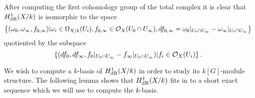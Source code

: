 After computing the first cohomology group of the total complex it is clear that $H_{\text {dR}}^1(X/k)$ is isomorphic to the space
    \begin{equation}\label{derhamconditions}
    \left\{(\omega_0, \omega_\infty, f_{0,\infty}) | \omega_i\in \Omega_{X/k}(U_i), f_{0,\infty}\in {\cal O}_X(U_0 \cap U_\infty), df_{0,\infty} = \omega_0|_{U_0\cap U_\infty} - \omega_\infty|_{U_0\cap U_\infty} \right\}
    \end{equation}
quotiented by the subspace
    \begin{equation}\label{quotient}
    \left\{  (df_0, df_\infty, f_0|_{U_0\cap U_\infty} -f_\infty|_{U_0\cap U_\infty} )|f_i \in {\cal O}_X(U_i)\right\}.
    \end{equation}

We wish to compute a $k$-basis of $H_{\text {dR}}^1(X/k)$ in order to study its $k[G]$-module structure.
The following lemma shows that $H_{\text {dR}}^1(X/k)$ fits in to a short exact sequence which we will use to compute the $k$-basis.
    
